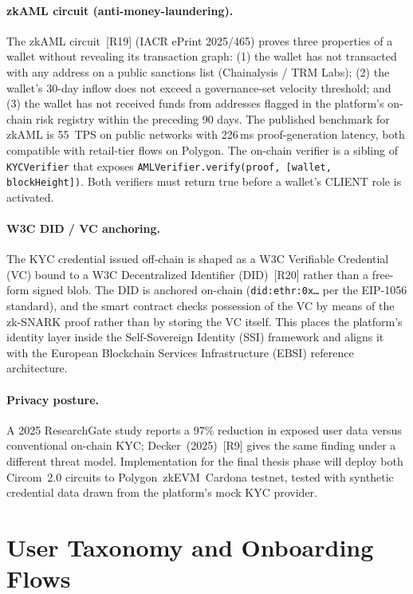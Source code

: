 \documentclass[12pt,a4paper]{report}
\begin{document}
\paragraph{zkAML circuit (anti-money-laundering).}
The zkAML circuit~[R19] (IACR ePrint 2025/465) proves three properties of a wallet without revealing its transaction graph: (1) the wallet has not transacted with any address on a public sanctions list (Chainalysis / TRM Labs); (2) the wallet's 30-day inflow does not exceed a governance-set velocity threshold; and (3) the wallet has not received funds from addresses flagged in the platform's on-chain risk registry within the preceding 90 days. The published benchmark for zkAML is 55~TPS on public networks with 226\,ms proof-generation latency, both compatible with retail-tier flows on Polygon. The on-chain verifier is a sibling of \texttt{KYCVerifier} that exposes \texttt{AMLVerifier.verify(proof, [wallet, blockHeight])}. Both verifiers must return true before a wallet's CLIENT role is activated.

\paragraph{W3C DID / VC anchoring.}
The KYC credential issued off-chain is shaped as a W3C Verifiable Credential (VC) bound to a W3C Decentralized Identifier (DID)~[R20] rather than a free-form signed blob. The DID is anchored on-chain (\texttt{did:ethr:0x\ldots} per the EIP-1056 standard), and the smart contract checks possession of the VC by means of the zk-SNARK proof rather than by storing the VC itself. This places the platform's identity layer inside the Self-Sovereign Identity (SSI) framework and aligns it with the European Blockchain Services Infrastructure (EBSI) reference architecture.

\paragraph{Privacy posture.}
A 2025 ResearchGate study reports a 97\% reduction in exposed user data versus conventional on-chain KYC; Decker~(2025)~[R9] gives the same finding under a different threat model. Implementation for the final thesis phase will deploy both Circom~2.0 circuits to Polygon~zkEVM~Cardona testnet, tested with synthetic credential data drawn from the platform's mock KYC provider.

\section{User Taxonomy and Onboarding Flows}
\label{sec:onboarding}
\end{document}
